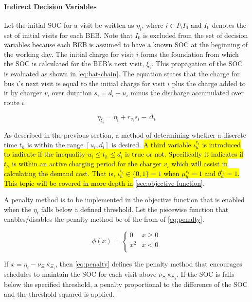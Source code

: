 \documentclass[11pt,a4paper,final]{article}
\newcommand{\Iset}{I}                       %
\begin{document}
\paragraph{Indirect Decision Variables}
\label{sec:indirect-decision-variables}
Let the initial SOC for a visit be written as \(\eta_i\), where \(i \in \Iset \setminus \Iset_0\) and \(\Iset_0\) denotes the set of
initial visits for each BEB. Note that \(\Iset_0\) is excluded from the set of decision variables because each BEB is
assumed to have a known SOC at the beginning of the working day. The initial charge for visit \(i\) forms the foundation
from which the SOC is calculated for the BEB's next visit, \(\xi_i\). This propagation of the SOC is evaluated as shown in
\ref{eq:bat-chain}. The equation states that the charge for bus \(i\)'s next visit is equal to the initial charge for visit \(i\)
plus the charge added to it by charger \(v_i\) over duration \(s_i = d_i - u_i\) minus the discharge accumulated over route
\(i\).

\begin{equation}
\label{eq:bat-chain}
  \eta_{\xi_i} = \eta_i + r_{v_i}s_i - \Delta_i
\end{equation}

As described in the previous section, a method of determining whether a discrete time \(t_h\) is within the range \([u_i,
d_i]\) is desired. \hl{A third variable $\iota_h^{v_i}$ is introduced to indicate if the inequality $u_i \le t_h \le d_i$ is true or not. Specifically it indicates if $t_h$ is within an active charging period for the charger $v_i$ which will assist in calculating the demand cost. That is, $\iota_h^{v_i} \in \{0,1\} = 1$ when $\mu_h^{v_i} = 1$ and $\theta_h^{v_i} = 1$. This topic will be covered in more depth in} \ref{sec:objective-function}.

A penalty method is to be implemented in the objective function that is enabled when the \(\eta_i\) falls below a defined
threshold. Let the piecewise function that enables/disables the penalty method be of the from of \ref{eq:penalty}.

\begin{equation}
\label{eq:penalty}
  \phi(x) =
  \begin{cases}
    0   & x \ge 0 \\
    x^2 & x < 0\\
  \end{cases}
\end{equation}

If \(x = \eta_i - \nu_{\Xi_i} \kappa_{\Xi_i}\), then \ref{eq:penalty} defines the penalty method that encourages schedules to maintain the SOC
for each visit above \(\nu_{\Xi_i} \kappa_{\Xi_i}\). If the SOC is falls below the specified threshold, a penalty proportional to the
difference of the SOC and the threshold squared is applied.
\end{document}
